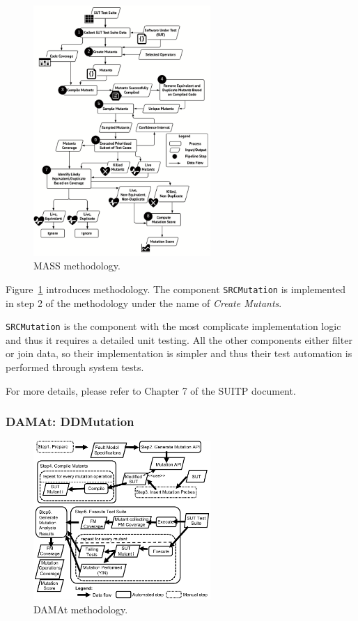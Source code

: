 \begin{figure}[t]
  \centering
  \includegraphics[width=0.6\textwidth]{images/Approach.pdf}
      \caption{MASS methodology.}
      \label{fig:mass}
\end{figure}

Figure~\ref{fig:mass} introduces \MASS methodology. The component \texttt{SRCMutation} is implemented in step 2 of the methodology under the name of \emph{Create Mutants}.

\texttt{SRCMutation} is the component with the most complicate implementation logic and thus it requires a detailed unit testing. All the other components either filter or join data, so their implementation is simpler and thus their test automation is performed through system tests.

For more details, please refer to Chapter 7 of the SUITP document.


\subsubsection{DAMAt: DDMutation}

\begin{figure}[t]
  \centering
  \includegraphics[width=0.6\textwidth]{images/dataDrivenBufferProcess.pdf}
      \caption{DAMAt methodology.}
      \label{fig:damat}
\end{figure}

